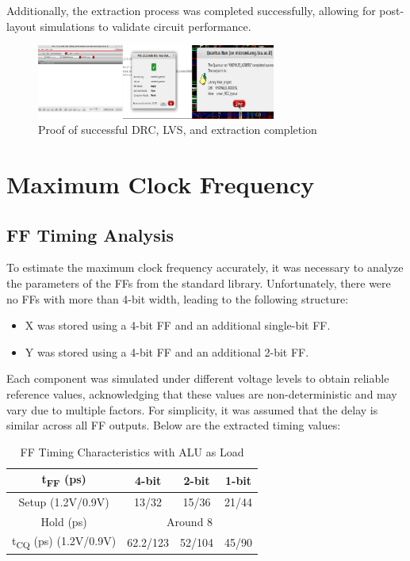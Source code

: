 \documentclass[a4paper,12pt]{article}
\begin{document}
Additionally, the extraction process was completed successfully, allowing for post-layout simulations to validate circuit performance.

\begin{figure}[H]
    \centering
    \includegraphics[width=0.7\textwidth]{images/LO_prove.png}
    \caption{Proof of successful DRC, LVS, and extraction completion}
\end{figure}




\section{ Maximum Clock Frequency}
\subsection{FF Timing Analysis}
To estimate the maximum clock frequency accurately, it was necessary to analyze the parameters of the FFs from the standard library. Unfortunately, there were no FFs with more than 4-bit width, leading to the following structure:
\begin{itemize}
    \item X was stored using a 4-bit FF and an additional single-bit FF.
    \item Y was stored using a 4-bit FF and an additional 2-bit FF.
\end{itemize}
Each component was simulated under different voltage levels to obtain reliable reference values, acknowledging that these values are non-deterministic and may vary due to multiple factors. For simplicity, it was assumed that the delay is similar across all FF outputs. Below are the extracted timing values:

\begin{table}[H]
    \centering
    \begin{tabular}{|c|c|c|c|}
        \hline
        t\textsubscript{FF} (ps) & 4-bit & 2-bit & 1-bit \\
        \hline
        Setup (1.2V/0.9V) & 13/32 & 15/36 & 21/44 \\
        \hline
        Hold (ps) & \multicolumn{3}{c|}{Around 8} \\
        \hline
        t\textsubscript{CQ} (ps) (1.2V/0.9V) & 62.2/123 & 52/104 & 45/90 \\
        \hline
    \end{tabular}
    \caption{FF Timing Characteristics with ALU as Load}
\end{table}
\end{document}
